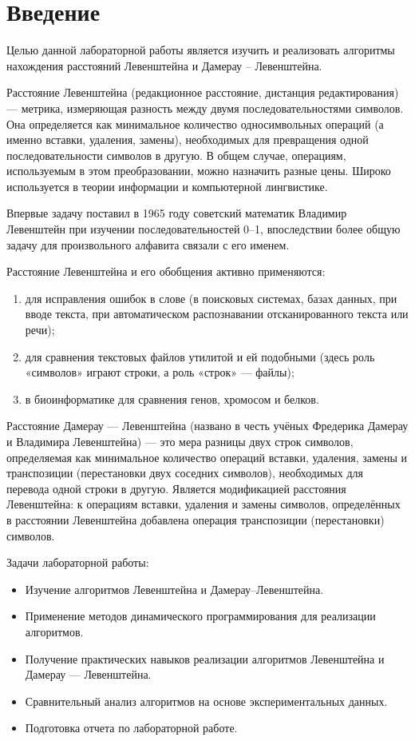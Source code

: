 \chapter*{Введение}

Целью данной лабораторной работы является изучить и реализовать алгоритмы нахождения расстояний Левенштейна и Дамерау -- Левенштейна.

Расстояние Левенштейна (редакционное расстояние, дистанция редактирования) — метрика, измеряющая разность между двумя последовательностями символов. Она определяется как минимальное количество односимвольных операций (а именно вставки, удаления, замены), необходимых для превращения одной последовательности символов в другую. В общем случае, операциям, используемым в этом преобразовании, можно назначить разные цены. Широко используется в теории информации и компьютерной лингвистике.

Впервые задачу поставил в 1965 году советский математик Владимир Левенштейн при изучении последовательностей 0--1, впоследствии более общую задачу для произвольного алфавита связали с его именем.

Расстояние Левенштейна и его обобщения активно применяются: 
\begin{enumerate}[label={\arabic*)}]
	\item для исправления ошибок в слове (в поисковых системах, базах данных, при вводе текста, при автоматическом распознавании отсканированного текста или речи);
	\item для сравнения текстовых файлов утилитой  и ей подобными (здесь роль «символов» играют строки, а роль «строк» — файлы);
	\item в биоинформатике для сравнения генов, хромосом и белков.
\end{enumerate}

Расстояние Дамерау — Левенштейна (названо в честь учёных Фредерика Дамерау и Владимира Левенштейна) — это мера разницы двух строк символов, определяемая как минимальное количество операций вставки, удаления, замены и транспозиции (перестановки двух соседних символов), необходимых для перевода одной строки в другую. Является модификацией расстояния Левенштейна: к операциям вставки, удаления и замены символов, определённых в расстоянии Левенштейна добавлена операция транспозиции (перестановки) символов.

Задачи лабораторной работы:

\begin{itemize}
	\item Изучение алгоритмов Левенштейна и Дамерау--Левенштейна.
	\item Применение методов динамического программирования для реализации алгоритмов.
	\item Получение практических навыков реализации алгоритмов Левенштейна и Дамерау — Левенштейна.
	\item Сравнительный анализ алгоритмов на основе экспериментальных данных.
	\item Подготовка отчета по лабораторной работе.
\end{itemize}
